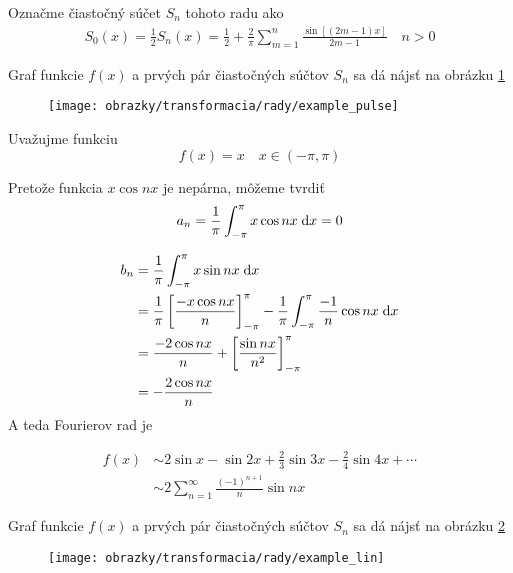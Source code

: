 \begin{priklad}
    Označme čiastočný súčet $S_n$ tohoto radu ako 
    \begin{align}
        S_0(x) = \frac{1}{2}
        S_n(x) = \frac{1}{2} + \frac{2}{\pi} \sum_{m=1}^{n}
                \frac{\sin\left[ (2m-1) x\right]}{2m-1} \quad n>0
    \end{align}
    
    Graf funkcie $f(x)$ a prvých pár čiastočných súčtov $S_n$ sa dá
    nájsť na obrázku \ref{fig:example_pulse}

    \begin{figure}[htp]
        \centering
        \texttt{[image: obrazky/transformacia/rady/example\_pulse]}
        \caption{}
        \label{fig:example_pulse}
    \end{figure}    
\end{priklad}

\begin{priklad}
   Uvažujme funkciu 
   \begin{equation}
        f(x) = x \quad x \in(-\pi,\pi)
   \end{equation}

    Pretože funkcia $x \cos nx$ je nepárna, môžeme tvrdiť
   \begin{equation}
        a_n = \frac{1}{\pi} \int_{-\pi}^{\pi} x \cos nx \; \mathrm{d} x =0
   \end{equation}

   \begin{align}
        b_n &= \frac{1}{\pi} \int_{-\pi}^{\pi} x \sin nx \; \mathrm{d} x \\
        &= \frac{1}{\pi} \left[
            \frac{- x \cos nx}{n}
            \right]_{-\pi}^\pi -
            \frac{1}{\pi} \int_{-\pi}^{\pi} \frac{-1}{n} \cos nx \; \mathrm{d} x  \\
        &=
        \frac{-2 \cos nx}{n} + 
            \left[
                \frac{\sin nx}{n^2}
            \right]_{-\pi}^{\pi} \\
        &= -\frac{2 \cos nx}{n}
   \end{align}
   A teda Fourierov rad je
   
   \begin{align}
   f(x) &\sim 2 \sin x - \sin 2x + \frac{2}{3} \sin 3x - \frac{2}{4}
    \sin 4x + \cdots \\
     &\sim 2\sum_{n=1}^{\infty} \frac{(-1)^{n+1}}{n} \sin nx
    \end{align}
    
    Graf funkcie $f(x)$ a prvých pár čiastočných súčtov $S_n$ sa dá
    nájsť na obrázku \ref{fig:example_lin}

    \begin{figure}[htp]
        \centering
        \texttt{[image: obrazky/transformacia/rady/example\_lin]}
        \caption{}
        \label{fig:example_lin}
    \end{figure}
\end{priklad}

